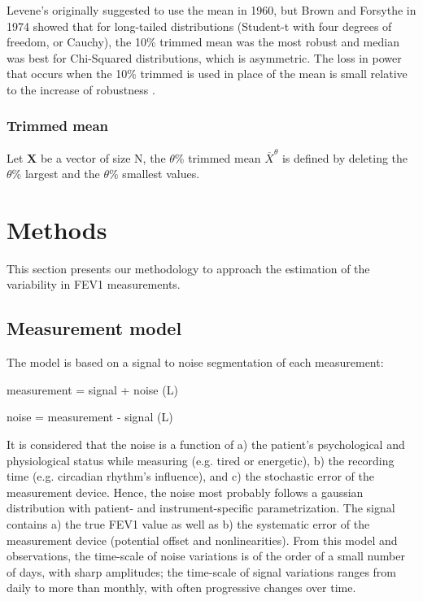 Levene's originally suggested to use the mean in 1960, but Brown and Forsythe in 1974 showed that for long-tailed distributions (Student-t with four degrees of freedom, or Cauchy), the 10\% trimmed mean was the most robust and median was best for Chi-Squared distributions, which is asymmetric. The loss in power that occurs when the 10\% trimmed is used in place of the mean is small relative to the increase of robustness \cite{brown_1974}.

\subsubsection{Trimmed mean}
Let $\mathbf{X}$ be a vector of size N, the $\theta$\% trimmed mean $\overline{X}^{\theta}$ is defined by deleting the $\theta$\% largest and the $\theta$\% smallest values.

\section{Methods}
This section presents our methodology to approach the estimation of the variability in FEV1 measurements.

\subsection{Measurement model}
The model is based on a signal to noise segmentation of each measurement:
\begin{center}
    measurement = signal + noise (L)
\end{center}
\begin{center}
    noise = measurement - signal (L)
\end{center}
It is considered that the noise is a function of a) the patient’s psychological and physiological status while measuring (e.g. tired or energetic), b) the recording time (e.g. circadian rhythm’s influence), and c) the stochastic error of the measurement device. Hence, the noise most probably follows a gaussian distribution with patient- and instrument-specific parametrization. The signal contains a) the true FEV1 value as well as b) the systematic error of the measurement device (potential offset and nonlinearities). From this model and observations, the time-scale of noise variations is of the order of a small number of days, with sharp amplitudes; the time-scale of signal variations ranges from daily to more than monthly, with often progressive changes over time.

